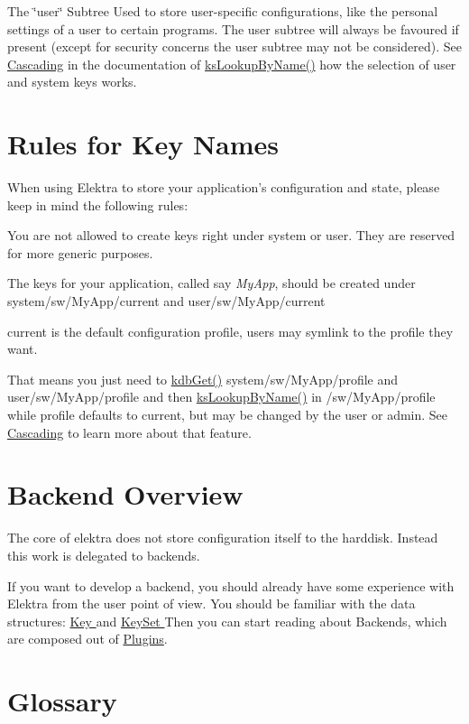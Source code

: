 \begin{DoxyItemize}
\item The \char`\"{}user\char`\"{} Subtree Used to store user-\/specific configurations, like the personal settings of a user to certain programs. The user subtree will always be favoured if present (except for security concerns the user subtree may not be considered). See \hyperlink{group__keyset_cascading}{Cascading} in the documentation of \hyperlink{group__keyset_gad2e30fb6d4739d917c5abb2ac2f9c1a1}{ks\-Lookup\-By\-Name()} how the selection of user and system keys works.
\end{DoxyItemize}\hypertarget{index_rules}{}\section{Rules for Key Names}\label{index_rules}
When using Elektra to store your application's configuration and state, please keep in mind the following rules\-:
\begin{DoxyItemize}
\item You are not allowed to create keys right under {\ttfamily system} or {\ttfamily user}. They are reserved for more generic purposes.
\item The keys for your application, called say {\itshape My\-App}, should be created under {\ttfamily system/sw/\-My\-App/current} and {\ttfamily user/sw/\-My\-App/current} 
\item current is the default configuration profile, users may symlink to the profile they want.
\item That means you just need to \hyperlink{group__kdb_ga28e385fd9cb7ccfe0b2f1ed2f62453a1}{kdb\-Get()} {\ttfamily system/sw/\-My\-App/profile} and {\ttfamily user/sw/\-My\-App/profile} and then \hyperlink{group__keyset_gad2e30fb6d4739d917c5abb2ac2f9c1a1}{ks\-Lookup\-By\-Name()} in {\ttfamily /sw/\-My\-App/profile} while profile defaults to current, but may be changed by the user or admin. See \hyperlink{group__keyset_cascading}{Cascading} to learn more about that feature.
\end{DoxyItemize}\hypertarget{index_backendsoverview}{}\section{Backend Overview}\label{index_backendsoverview}
The core of elektra does not store configuration itself to the harddisk. Instead this work is delegated to backends.

If you want to develop a backend, you should already have some experience with Elektra from the user point of view. You should be familiar with the data structures\-: \hyperlink{group__key}{Key } and \hyperlink{group__keyset}{Key\-Set } Then you can start reading about Backends, which are composed out of \hyperlink{group__plugin}{Plugins}.\hypertarget{index_glossary}{}\section{Glossary}\label{index_glossary}

